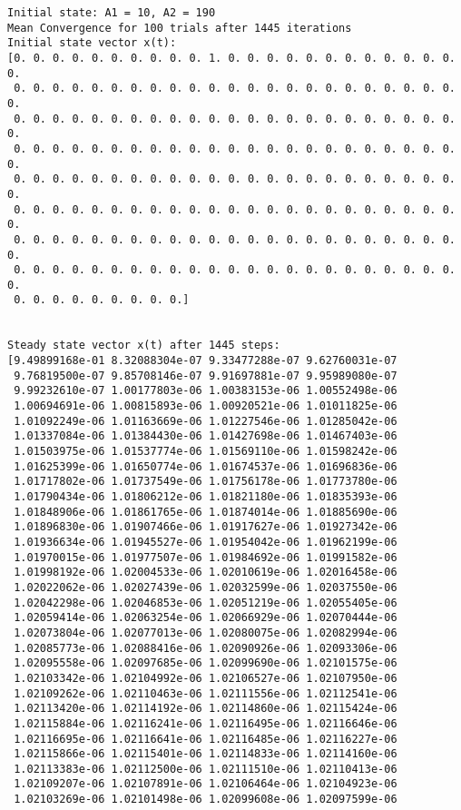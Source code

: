 \documentclass[11pt]{article}
\begin{document}
\begin{Verbatim}[commandchars=\\\{\}]
Initial state: A1 = 10, A2 = 190
Mean Convergence for 100 trials after 1445 iterations
Initial state vector x(t):
[0. 0. 0. 0. 0. 0. 0. 0. 0. 0. 1. 0. 0. 0. 0. 0. 0. 0. 0. 0. 0. 0. 0. 0.
 0. 0. 0. 0. 0. 0. 0. 0. 0. 0. 0. 0. 0. 0. 0. 0. 0. 0. 0. 0. 0. 0. 0. 0.
 0. 0. 0. 0. 0. 0. 0. 0. 0. 0. 0. 0. 0. 0. 0. 0. 0. 0. 0. 0. 0. 0. 0. 0.
 0. 0. 0. 0. 0. 0. 0. 0. 0. 0. 0. 0. 0. 0. 0. 0. 0. 0. 0. 0. 0. 0. 0. 0.
 0. 0. 0. 0. 0. 0. 0. 0. 0. 0. 0. 0. 0. 0. 0. 0. 0. 0. 0. 0. 0. 0. 0. 0.
 0. 0. 0. 0. 0. 0. 0. 0. 0. 0. 0. 0. 0. 0. 0. 0. 0. 0. 0. 0. 0. 0. 0. 0.
 0. 0. 0. 0. 0. 0. 0. 0. 0. 0. 0. 0. 0. 0. 0. 0. 0. 0. 0. 0. 0. 0. 0. 0.
 0. 0. 0. 0. 0. 0. 0. 0. 0. 0. 0. 0. 0. 0. 0. 0. 0. 0. 0. 0. 0. 0. 0. 0.
 0. 0. 0. 0. 0. 0. 0. 0. 0.]


Steady state vector x(t) after 1445 steps:
[9.49899168e-01 8.32088304e-07 9.33477288e-07 9.62760031e-07
 9.76819500e-07 9.85708146e-07 9.91697881e-07 9.95989080e-07
 9.99232610e-07 1.00177803e-06 1.00383153e-06 1.00552498e-06
 1.00694691e-06 1.00815893e-06 1.00920521e-06 1.01011825e-06
 1.01092249e-06 1.01163669e-06 1.01227546e-06 1.01285042e-06
 1.01337084e-06 1.01384430e-06 1.01427698e-06 1.01467403e-06
 1.01503975e-06 1.01537774e-06 1.01569110e-06 1.01598242e-06
 1.01625399e-06 1.01650774e-06 1.01674537e-06 1.01696836e-06
 1.01717802e-06 1.01737549e-06 1.01756178e-06 1.01773780e-06
 1.01790434e-06 1.01806212e-06 1.01821180e-06 1.01835393e-06
 1.01848906e-06 1.01861765e-06 1.01874014e-06 1.01885690e-06
 1.01896830e-06 1.01907466e-06 1.01917627e-06 1.01927342e-06
 1.01936634e-06 1.01945527e-06 1.01954042e-06 1.01962199e-06
 1.01970015e-06 1.01977507e-06 1.01984692e-06 1.01991582e-06
 1.01998192e-06 1.02004533e-06 1.02010619e-06 1.02016458e-06
 1.02022062e-06 1.02027439e-06 1.02032599e-06 1.02037550e-06
 1.02042298e-06 1.02046853e-06 1.02051219e-06 1.02055405e-06
 1.02059414e-06 1.02063254e-06 1.02066929e-06 1.02070444e-06
 1.02073804e-06 1.02077013e-06 1.02080075e-06 1.02082994e-06
 1.02085773e-06 1.02088416e-06 1.02090926e-06 1.02093306e-06
 1.02095558e-06 1.02097685e-06 1.02099690e-06 1.02101575e-06
 1.02103342e-06 1.02104992e-06 1.02106527e-06 1.02107950e-06
 1.02109262e-06 1.02110463e-06 1.02111556e-06 1.02112541e-06
 1.02113420e-06 1.02114192e-06 1.02114860e-06 1.02115424e-06
 1.02115884e-06 1.02116241e-06 1.02116495e-06 1.02116646e-06
 1.02116695e-06 1.02116641e-06 1.02116485e-06 1.02116227e-06
 1.02115866e-06 1.02115401e-06 1.02114833e-06 1.02114160e-06
 1.02113383e-06 1.02112500e-06 1.02111510e-06 1.02110413e-06
 1.02109207e-06 1.02107891e-06 1.02106464e-06 1.02104923e-06
 1.02103269e-06 1.02101498e-06 1.02099608e-06 1.02097599e-06

\end{Verbatim}
\end{document}
